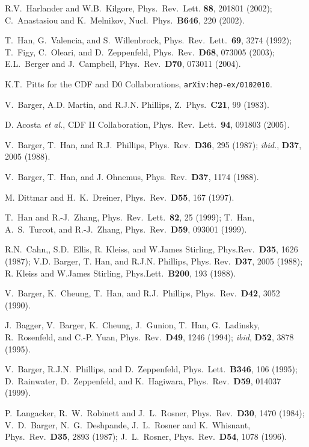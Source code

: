\documentclass[12pt,prd,aps,floats,preprintnumbers,preprint,superscriptaddress,floatfix,nofootinbib]{revtex4}
\begin{document}
\begin{thebibliography}{99}
R.V.~Harlander and W.B.~Kilgore,  Phys.~Rev.~Lett. {\bf 88}, 201801 (2002);
 C.~Anastasiou and K.~Melnikov, Nucl.~Phys.~{\bf B646}, 220 (2002).

 T.~Han, G.~Valencia, and S.~Willenbrock,
Phys.~Rev.~Lett.~{\bf 69}, 3274 (1992);  
T.~Figy, C.~Oleari, and D.~Zeppenfeld,  Phys.~Rev.~{\bf D68}, 073005 (2003);  
E.L.~Berger and  J.~Campbell,  Phys.~Rev.~{\bf D70}, 073011 (2004).

 K.T.~Pitts for the CDF and D0 Collaborations, 
{\tt arXiv:hep-ex/0102010}.

 V.~Barger, A.D. Martin, and R.J.N. Phillips, Z.~Phys.~{\bf C21}, 99 (1983).
 
  D. Acosta {\it et al.}, CDF II Collaboration, 
Phys.~Rev.~Lett.~{\bf 94}, 091803 (2005).

 V.~Barger, T.~Han, and R.J.~Phillips, 
Phys.~Rev.~{\bf D36}, 295 (1987); {\it ibid.}, {\bf D37}, 2005 (1988).

 V.~Barger, T.~Han, and J. Ohnemus,  Phys.~Rev.~{\bf D37}, 1174 (1988).

M. Dittmar and H.~K.~Dreiner, Phys.~Rev.~{\bf D55}, 167 (1997).
 
   T.~Han and R.-J.~Zhang, Phys.~Rev.~Lett.~{\bf 82}, 25 (1999); 
   T.~Han, A.~S.~Turcot, and R.-J.~Zhang, Phys.~Rev.~{\bf D59}, 093001 (1999).

 R.N.~Cahn,, S.D.~Ellis, R. Kleiss, and W.James Stirling,
 Phys.Rev.~{\bf D35}, 1626 (1987); 
  V.D. Barger, T. Han, and R.J.N. Phillips,
  Phys. Rev.~{\bf D37}, 2005 (1988);
   R. Kleiss and  W.James Stirling, Phys.Lett.~{\bf B200}, 193 (1988).

 V.~Barger, K.~Cheung, T.~Han, and R.J.~Phillips, 
Phys.~Rev.~{\bf D42}, 3052 (1990).

 J.~Bagger, V.~Barger, K.~Cheung, J.~Gunion, 
T.~Han, G.~Ladinsky, R.~Rosenfeld, and C.-P. Yuan,
Phys.~Rev.~{\bf D49}, 1246 (1994); {\it ibid}, {\bf D52}, 3878 (1995).

V.~Barger, R.J.N.~Phillips, and D.~Zeppenfeld,
Phys.~Lett.~{\bf B346}, 106 (1995); 
D.~Rainwater, D.~Zeppenfeld, and K.~Hagiwara,
Phys.~Rev.~{\bf D59}, 014037 (1999).

P.~Langacker, R.~W.~Robinett and J.~L.~Rosner,
Phys.\ Rev.\ {\bf D30}, 1470 (1984);
V.~D.~Barger, N.~G.~Deshpande, J.~L.~Rosner and K.~Whisnant,
Phys.\ Rev.\ {\bf D35}, 2893 (1987);
J.~L.~Rosner,
Phys.\ Rev.\ {\bf D54}, 1078 (1996).


\end{thebibliography}
\end{document}
